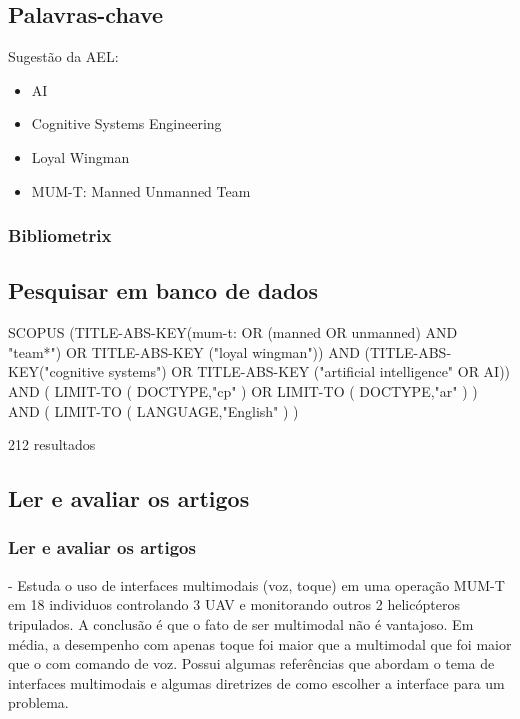 \documentclass{article}
\begin{document}
\subsection{Palavras-chave}

Sugestão da AEL: 
\begin{itemize}
    \item AI
    \item Cognitive Systems Engineering
    \item Loyal Wingman
    \item MUM-T: Manned Unmanned Team    
\end{itemize}  


\subsubsection{Bibliometrix}

\subsection{Pesquisar em banco de dados}

SCOPUS
(TITLE-ABS-KEY(mum-t: OR (manned OR unmanned) AND "team*") OR TITLE-ABS-KEY ("loyal wingman")) AND (TITLE-ABS-KEY("cognitive systems") OR TITLE-ABS-KEY ("artificial intelligence" OR AI)) AND ( LIMIT-TO ( DOCTYPE,"cp" ) OR LIMIT-TO ( DOCTYPE,"ar" ) ) AND ( LIMIT-TO ( LANGUAGE,"English" ) )

212 resultados

\subsection{Ler e avaliar os artigos}

\subsubsection{Ler e avaliar os artigos}

 - Estuda o uso de interfaces multimodais (voz, toque) em uma operação MUM-T em 18 individuos controlando 3 UAV e monitorando outros 2 helicópteros tripulados. A conclusão é que o fato de ser multimodal não é vantajoso. Em média, a desempenho com apenas toque foi maior que a multimodal que foi maior que o com comando de voz. Possui algumas referências que abordam o tema de interfaces multimodais e algumas diretrizes de como escolher a interface para um problema.
\end{document}
